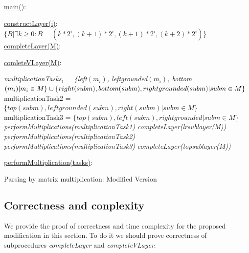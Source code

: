 \begin{algorithm}[h!]
\SetAlgoNoLine
{}
\underline{main()}{:}{

 \BlankLine
 }

\underline{constructLayer(i)}{:}{
 \BlankLine
 $\{B | \exists k \geq 0 : B = (k*2^i, (k+1)*2^i, (k + 1)*2^i, (k+2)*2^i) \}$
 \BlankLine
    }
\underline{completeLayer(M)}{:}{
\BlankLine
{}
\BlankLine
}

\underline{comleteVLayer(M)}{:}{
 \BlankLine
 \textit{multiplicationTasks$_1$ = \{left$(m_i)$, leftgrounded$(m_i)$, bottom$(m_i) | m_i \in M \} \cup \linebreak  \{right(subm), bottom(subm), rightgrounded(subm) | subm \in M\}$\;}
 \BlankLine
 multiplicationTask2 = $\{top(subm), leftgrounded(subm), right(subm) | subm \in M\}$\;
 \BlankLine
 multiplicationTask3 = $\{top(subm), left(subm), rightgrounded |subm \in M\}$\;
 \BlankLine
 \textit{performMultiplications(multiplicationTask1)}\;
 \textit{completeLayer(lrsublayer(M))}\;
 \textit{performMultiplications(multiplicationTask2)}\;
 \textit{performMultiplications(multiplicationTask3)}\;
 \textit{completeLayer(topsublayer(M))}

 }
 \BlankLine

 \underline{performMultiplication(tasks)}{:}{\\
 }

\caption{Parsing by matrix multiplication: Modified Version}
\label{algo:modified}
\end{algorithm}


\subsection{Correctness and conplexity}

We provide the proof of correctness and time complexity for the proposed modification in this section.
To do it we should prove correctness of subprocedures \textit{completeLayer} and \textit{completeVLayer}.

